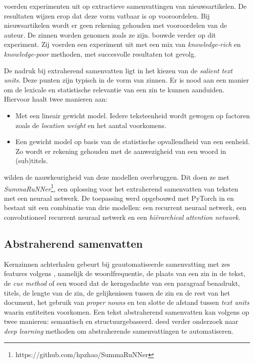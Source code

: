 
\textcite{McKeown1999} voerden experimenten uit op extractieve samenvattingen van nieuwsartikelen. De resultaten wijzen erop dat deze vorm vatbaar is op vooroordelen. Bij nieuwsartikelen wordt er geen rekening gehouden met vooroordelen van de auteur. De zinnen worden genomen zoals ze zijn. \textcite{Hahn2000} bouwde verder op dit experiment. Zij voerden een experiment uit met een mix van \textit{knowledge-rich} en \textit{knowledge-poor} methoden, met succesvolle resultaten tot gevolg.

De nadruk bij extraherend samenvatten ligt in het kiezen van de \textit{salient text units}. Deze punten zijn typisch in de vorm van zinnen. Er is nood aan een manier om de lexicale en statistische relevantie van een zin te kunnen aanduiden. Hiervoor haalt \textcite{Hahn2000} twee manieren aan:

\begin{itemize}
	\item Met een lineair gewicht model. Iedere teksteenheid wordt gewogen op factoren zoals de \textit{location weight} en het aantal voorkomens.
	\item Een gewicht model op basis van de statistische opvallendheid van een eenheid. Zo wordt er rekening gehouden met de aanwezigheid van een woord in (sub)titels.
\end{itemize}


\textcite{Nallapati2017} wilden de nauwkeurigheid van deze modellen overbruggen. Dit doen ze met \textit{SummaRuNNer}\footnote{https://github.com/hpzhao/SummaRuNNer}, een oplossing voor het extraherend samenvatten van teksten met een neuraal netwerk. De toepassing werd opgebouwd met PyTorch in  en bestaat uit een combinatie van drie modellen: een recurrent neuraal netwerk, een convolutioneel recurrent neuraal netwerk en een \textit{hiërarchical attention network}.

\subsection{Abstraherend samenvatten}

Kernzinnen achterhalen gebeurt bij geautomatiseerde samenvatting met zes features volgens \textcite{Khan2014}, namelijk de woordfrequentie, de plaats van een zin in de tekst, de \textit{cue method} of een woord dat de kerngedachte van een paragraaf benadrukt, titels, de lengte van de zin, de gelijkenissen tussen de zin en de rest van het document, het gebruik van \textit{proper nouns} en ten slotte de afstand tussen \textit{text units} waarin entiteiten voorkomen. Een tekst abstraherend samenvatten kan volgens \textcite{Khan2014} op twee manieren: semantisch en structuurgebaseerd. \textcite{Cao2022} deed verder onderzoek naar \textit{deep learning} methoden om abstraherende samenvattingen te automatiseren.


